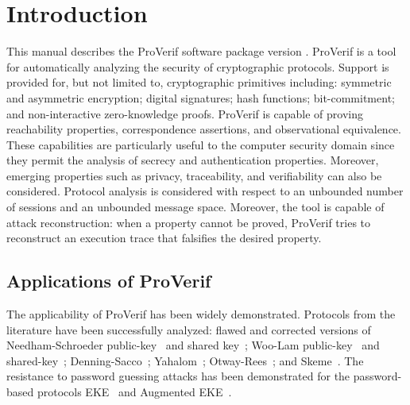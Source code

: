\documentclass{book}
\begin{document}
\mainmatter


\chapter{Introduction}

This manual describes the ProVerif software package version \V. ProVerif is a tool for automatically analyzing the security of cryptographic protocols. Support is provided for, but not limited to, cryptographic primitives including: symmetric and asymmetric encryption; digital signatures; hash functions; bit-commitment; and non-interactive zero-knowledge proofs. ProVerif is capable of proving reachability properties, correspondence assertions, and observational equivalence. These capabilities are particularly useful to the computer security domain since they permit the analysis of secrecy and authentication properties. Moreover, emerging properties such as privacy, traceability, and verifiability can also be considered. Protocol analysis is considered with respect to an unbounded number of sessions and an unbounded message space. Moreover, the tool is capable of attack reconstruction: when a property cannot be proved, ProVerif tries to reconstruct an execution trace that falsifies the desired property.

\section{Applications of ProVerif}\label{sec:applications}

The applicability of ProVerif has been widely demonstrated. Protocols from the literature have been successfully analyzed: flawed and corrected versions of Needham-Schroeder public-key~\cite{Needham78,Lowe96} and shared key~\cite{Needham78,Burrows89,Needham87}; Woo-Lam public-key~\cite{Woo92,Woo97} and shared-key~\cite{Woo92,Anderson95,Abadi96,Woo97,Gordon2003}; Denning-Sacco~\cite{Denning81,Abadi96}; Yahalom~\cite{Burrows89}; Otway-Rees~\cite{Otway87,Abadi96,Paulson98}; and Skeme~\cite{Krawczyk96}.
The resistance to password guessing attacks has been demonstrated for the password-based protocols EKE~\cite{Bellovin92} and Augmented EKE~\cite{Bellovin93}.
\end{document}

